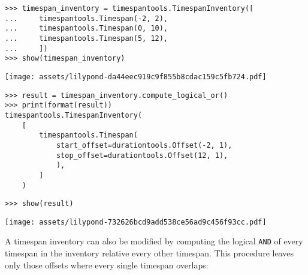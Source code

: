 \begin{comment}
<abjad>
timespan_inventory = timespantools.TimespanInventory([
    timespantools.Timespan(-2, 2),
    timespantools.Timespan(0, 10),
    timespantools.Timespan(5, 12),
    ])
show(timespan_inventory)
result = timespan_inventory.compute_logical_or()
print(format(result))
show(result)
</abjad>
\end{comment}

\begin{abjadbookoutput}
\begin{singlespacing}
\vspace{-0.5\baselineskip}
\begin{verbatim}
>>> timespan_inventory = timespantools.TimespanInventory([
...     timespantools.Timespan(-2, 2),
...     timespantools.Timespan(0, 10),
...     timespantools.Timespan(5, 12),
...     ])
>>> show(timespan_inventory)
\end{verbatim}
\noindent\texttt{[image: assets/lilypond-da44eec919c9f855b8cdac159c5fb724.pdf]}
\begin{verbatim}
>>> result = timespan_inventory.compute_logical_or()
>>> print(format(result))
timespantools.TimespanInventory(
    [
        timespantools.Timespan(
            start_offset=durationtools.Offset(-2, 1),
            stop_offset=durationtools.Offset(12, 1),
            ),
        ]
    )
\end{verbatim}
\begin{verbatim}
>>> show(result)
\end{verbatim}
\noindent\texttt{[image: assets/lilypond-732626bcd9add538ce56ad9c456f93cc.pdf]}
\end{singlespacing}
\end{abjadbookoutput}

\noindent A timespan inventory can also be modified by computing the logical
\texttt{AND} of every timespan in the inventory relative every other timespan.
This procedure leaves only those offsets where every single timespan
overlaps:

\begin{comment}
<abjad>
timespan_inventory = timespantools.TimespanInventory([
    timespantools.Timespan(-2, 8),
    timespantools.Timespan(0, 10),
    timespantools.Timespan(5, 12),
    ])
show(timespan_inventory)
result = timespan_inventory.compute_logical_and()
print(format(result))
show(result, range_=(-2, 12))
</abjad>
\end{comment}

